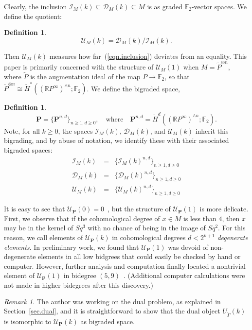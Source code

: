 \documentclass{amsart}
\theoremstyle{plain}
\theoremstyle{definition}
\newtheorem{definition}[theorem]{Definition}
\theoremstyle{remark}
\newtheorem{remark}[theorem]{Remark}
\begin{document}
Clearly, the inclusion $\mathcal{I}_M(k) \subseteq \mathcal{D}_M(k)
\subseteq M$ is as graded ${\mathbb{F}}_2$-vector spaces.  We define the
quotient:
\begin{definition}\label{def.U}
  \[
    \mathcal{U}_M(k) = \mathcal{D}_M(k) / \mathcal{I}_M(k).
  \]
\end{definition}
Then $\mathcal{U}_M(k)$ measures how far~(\ref{eqn.inclusion})
deviates from an equality.  This paper is primarily concerned with the
structure of $\mathcal{U}_M(1)$ when $M = \widetilde{P}^{\otimes n}$,
where $\widetilde{P}$ is the augmentation ideal of the map $P \to
{\mathbb{F}}_2$, so that $\widetilde{P}^{\otimes n} \cong \widetilde{H}^*(({\mathbb{R}}
P^{\infty})^{\wedge n}; {\mathbb{F}}_2)$.  We define the bigraded space,
\begin{definition}
  \[
    \mathbf{P} = \{ \mathbf{P}^{n,d} \}_{n \geq 1, d \geq 0}, \quad
    \textrm{where} \quad \mathbf{P}^{n,d} = \widetilde{H}^d(({\mathbb{R}}
    P^{\infty})^{\wedge n}; {\mathbb{F}}_2).
  \]
  Note, for all $k \geq 0$, the spaces $\mathcal{I}_M(k)$,
  $\mathcal{D}_M(k)$, and $\mathcal{U}_M(k)$ inherit this bigrading,
  and by abuse of notation, we identify these with their associated
  bigraded spaces:
  \begin{eqnarray*}
    \mathcal{I}_M(k) &=& \{ \mathcal{I}_M(k)^{n,d} \}_{n \geq 1, d
      \geq 0}\\ \mathcal{D}_M(k) &=& \{ \mathcal{D}_M(k)^{n,d} \}_{n
      \geq 1, d \geq 0}\\ \mathcal{U}_M(k) &=& \{
    \mathcal{U}_M(k)^{n,d} \}_{n \geq 1, d \geq 0}
  \end{eqnarray*}
\end{definition}
It is easy to see that $\mathcal{U}_{\mathbf{P}}(0) = 0$~\cite{AS},
but the structure of $\mathcal{U}_{\mathbf{P}}(1)$ is more delicate.
First, we observe that if the cohomological degree of $x \in M$ is
less than $4$, then $x$ may be in the kernel of $Sq^3$ with no chance
of being in the image of $Sq^2$.  For this reason, we call elements of
$\mathcal{U}_{\mathbf{P}}(k)$ in cohomological degrees $d < 2^{k+1}$
{\it degenerate elements}.  In preliminary work, we found that
$\mathcal{U}_{\mathbf{P}}(1)$ was devoid of non-degenerate elements in
all low bidgrees that could easily be checked by hand or computer.
However, further analysis and computation finally located a nontrivial
element of $\mathcal{U}_{\mathbf{P}}(1)$ in bidegree $(5,
9)$~\cite{A2}.  (Additional computer calculations were not made in
higher bidegrees after this discovery.)
\begin{remark}
  The author was working on the dual problem, as explained in
  Section~\ref{sec.dual}, and it is straightforward to show that the
  dual object $U_{\widetilde{\Gamma}}(k)$ is isomorphic to
  $\mathcal{U}_{\mathbf{P}}(k)$ as bigraded space.
\end{remark}
\end{document}
